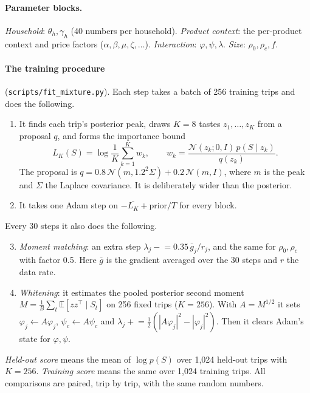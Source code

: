 \documentclass[11pt]{article}
\theoremstyle{remark}\newtheorem{remark}{Remark}
\newcommand{\E}{\mathbb{E}}
\newcommand{\N}{\mathcal{N}}
\begin{document}
\paragraph{Parameter blocks.} \emph{Household}: $\theta_h,\gamma_h$ (40 numbers per household).
\emph{Product context}: the per-product context and price factors ($\alpha,\beta,\mu,\zeta,\dots$).
\emph{Interaction}: $\varphi,\psi,\lambda$. \emph{Size}: $\rho_0,\rho_c,f$.

\paragraph{The training procedure} (\texttt{scripts/fit\_mixture.py}). Each step takes a batch of
256 training trips and does the following.
\begin{enumerate}
\item It finds each trip's posterior peak, draws $K=8$ tastes $z_1,\dots,z_K$ from a proposal $q$, and
  forms the importance bound
  \begin{equation}\label{eq:LK}
  L_K(S)=\log\frac1K\sum_{k=1}^K w_k,\qquad w_k=\frac{\N(z_k;0,I)\,p(S\mid z_k)}{q(z_k)}.
  \end{equation}
  The proposal is $q=0.8\,\N(m,1.2^2\Sigma)+0.2\,\N(m,I)$, where $m$ is the peak and $\Sigma$ the
  Laplace covariance. It is deliberately wider than the posterior.
\item It takes one Adam step on $-\overline{L_K}+\text{prior}/T$ for every block.
\end{enumerate}
Every 30 steps it also does the following.
\begin{enumerate}\setcounter{enumi}{2}
\item \emph{Moment matching}: an extra step $\lambda_j\mathrel{-}=0.35\,\bar g_j/r_j$, and the same
  for $\rho_0,\rho_c$ with factor 0.5. Here $\bar g$ is the gradient averaged over the 30 steps and
  $r$ the data rate.
\item \emph{Whitening}: it estimates the pooled posterior second moment
  $M=\frac1B\sum_t\E[zz^\top\mid S_t]$ on 256 fixed trips ($K=256$). With $A=M^{1/2}$ it sets
  $\varphi_j\leftarrow A\varphi_j$, $\psi_c\leftarrow A\psi_c$ and
  $\lambda_j\mathrel{+}=\frac12(|A\varphi_j|^2-|\varphi_j|^2)$. Then it clears Adam's state for
  $\varphi,\psi$.
\end{enumerate}
\emph{Held-out score} means the mean of $\log p(S)$ over 1,024 held-out trips with $K=256$.
\emph{Training score} means the same over 1,024 training trips. All comparisons are paired, trip
by trip, with the same random numbers.
\end{document}
